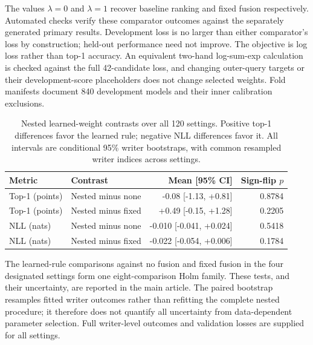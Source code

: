 \documentclass[10pt,a4paper]{article}
\begin{document}
The values $\lambda=0$ and $\lambda=1$ recover baseline ranking and fixed fusion respectively. Automated checks verify these comparator outcomes against the separately generated primary results. Development loss is no larger than either comparator's loss by construction; held-out performance need not improve. The objective is log loss rather than top-1 accuracy. An equivalent two-hand log-sum-exp calculation is checked against the full 42-candidate loss, and changing outer-query targets or their development-score placeholders does not change selected weights. Fold manifests document 840 development models and their inner calibration exclusions.

\begin{table}[ht]
\centering\small
\caption{Nested learned-weight contrasts over all 120 settings. Positive top-1 differences favor the learned rule; negative NLL differences favor it. All intervals are conditional 95\% writer bootstraps, with common resampled writer indices across settings.}
\begin{tabular}{llrr}\toprule
Metric & Contrast & Mean [95\% CI] & Sign-flip $p$\\\midrule
Top-1 (points) & Nested minus none & -0.08 [-1.13, +0.81] & 0.8784 \\
Top-1 (points) & Nested minus fixed & +0.49 [-0.15, +1.28] & 0.2205 \\
NLL (nats) & Nested minus none & -0.010 [-0.041, +0.024] & 0.5418 \\
NLL (nats) & Nested minus fixed & -0.022 [-0.054, +0.006] & 0.1784 \\
\bottomrule

\end{tabular}
\end{table}

The learned-rule comparisons against no fusion and fixed fusion in the four designated settings form one eight-comparison Holm family. These tests, and their uncertainty, are reported in the main article. The paired bootstrap resamples fitted writer outcomes rather than refitting the complete nested procedure; it therefore does not quantify all uncertainty from data-dependent parameter selection. Full writer-level outcomes and validation losses are supplied for all settings.
\end{document}
